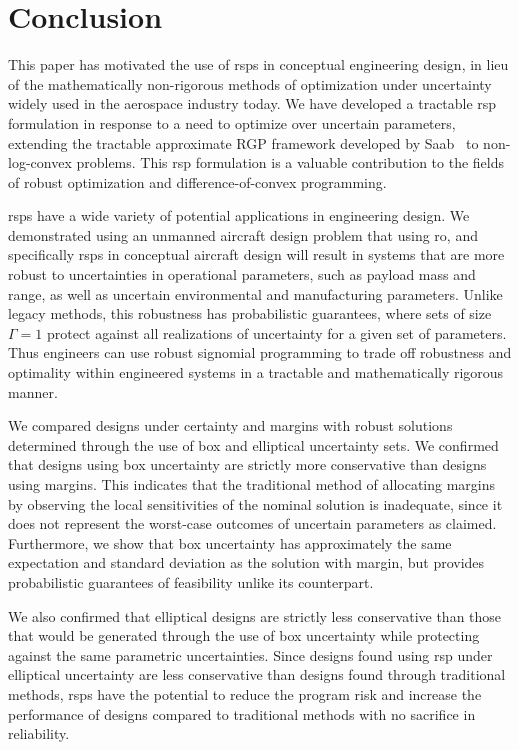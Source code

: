 \section{Conclusion}

This paper has motivated the use of \gls{rsp}s in conceptual engineering
design, in lieu of the mathematically non-rigorous methods of optimization under uncertainty
widely used in the aerospace industry today. We have developed a tractable \gls{rsp} formulation
in response to a need to optimize over uncertain parameters, extending
the tractable approximate RGP framework developed by Saab~\cite{Saab2018} to non-log-convex problems.
This \gls{rsp} formulation is a valuable contribution to the fields of robust
optimization and difference-of-convex programming.

\gls{rsp}s have a wide variety of potential applications in engineering design.
We demonstrated using an unmanned aircraft design problem
that using \gls{ro}, and specifically \gls{rsp}s in conceptual aircraft design will result in systems
that are more robust to uncertainties in operational parameters,
such as payload mass and range, as well as uncertain environmental and manufacturing parameters.
Unlike legacy methods, this robustness has probabilistic guarantees, where sets of size $\Gamma=1$
protect against all realizations of uncertainty for a given set of parameters.
Thus engineers can use robust signomial programming to trade off
robustness and optimality within engineered systems in a tractable and mathematically rigorous manner.

We compared designs under certainty and margins with robust solutions
determined through the use of box and elliptical uncertainty sets. We
confirmed that designs using box uncertainty are strictly more conservative
than designs using margins. This indicates that the traditional method of allocating margins
by observing the local sensitivities of the nominal solution is inadequate, since it does not
represent the worst-case outcomes of uncertain parameters as claimed. Furthermore, we show that box uncertainty
has approximately the same expectation and standard deviation as the solution with margin,
but provides probabilistic guarantees of feasibility unlike its counterpart.

We also confirmed that elliptical designs are strictly less conservative
than those that would be generated through the use of box uncertainty while protecting against the same
parametric uncertainties. Since designs found using \gls{rsp}
under elliptical uncertainty are less conservative
than designs found through traditional methods, \gls{rsp}s have the potential to reduce
the program risk and increase the performance
of designs compared to traditional methods with no sacrifice in reliability.

